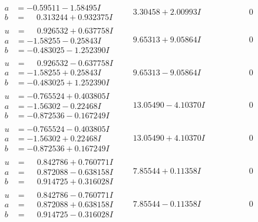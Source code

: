\documentclass[1p]{elsarticle_modified}
\theoremstyle{definition}
\begin{document}
$$\begin{array}{c|c|c}
\begin{aligned}
a &= -0.59511 - 1.58495 I \\
b &= \phantom{-}0.313244 + 0.932375 I\end{aligned}
 & \phantom{-}3.30458 + 2.00993 I & \phantom{-0.000000 } 0 \\ \hline\begin{aligned}
u &= \phantom{-}0.926532 + 0.637758 I \\
a &= -1.58255 - 0.25843 I \\
b &= -0.483025 - 1.252390 I\end{aligned}
 & \phantom{-}9.65313 + 9.05864 I & \phantom{-0.000000 } 0 \\ \hline\begin{aligned}
u &= \phantom{-}0.926532 - 0.637758 I \\
a &= -1.58255 + 0.25843 I \\
b &= -0.483025 + 1.252390 I\end{aligned}
 & \phantom{-}9.65313 - 9.05864 I & \phantom{-0.000000 } 0 \\ \hline\begin{aligned}
u &= -0.765524 + 0.403805 I \\
a &= -1.56302 - 0.22468 I \\
b &= -0.872536 - 0.167249 I\end{aligned}
 & \phantom{-}13.05490 - 4.10370 I & \phantom{-0.000000 } 0 \\ \hline\begin{aligned}
u &= -0.765524 - 0.403805 I \\
a &= -1.56302 + 0.22468 I \\
b &= -0.872536 + 0.167249 I\end{aligned}
 & \phantom{-}13.05490 + 4.10370 I & \phantom{-0.000000 } 0 \\ \hline\begin{aligned}
u &= \phantom{-}0.842786 + 0.760771 I \\
a &= \phantom{-}0.872088 - 0.638158 I \\
b &= \phantom{-}0.914725 + 0.316028 I\end{aligned}
 & \phantom{-}7.85544 + 0.11358 I & \phantom{-0.000000 } 0 \\ \hline\begin{aligned}
u &= \phantom{-}0.842786 - 0.760771 I \\
a &= \phantom{-}0.872088 + 0.638158 I \\
b &= \phantom{-}0.914725 - 0.316028 I\end{aligned}
 & \phantom{-}7.85544 - 0.11358 I & \phantom{-0.000000 } 0 \\ \hline\begin{aligned}

\end{aligned}
\end{array}$$
\end{document}
